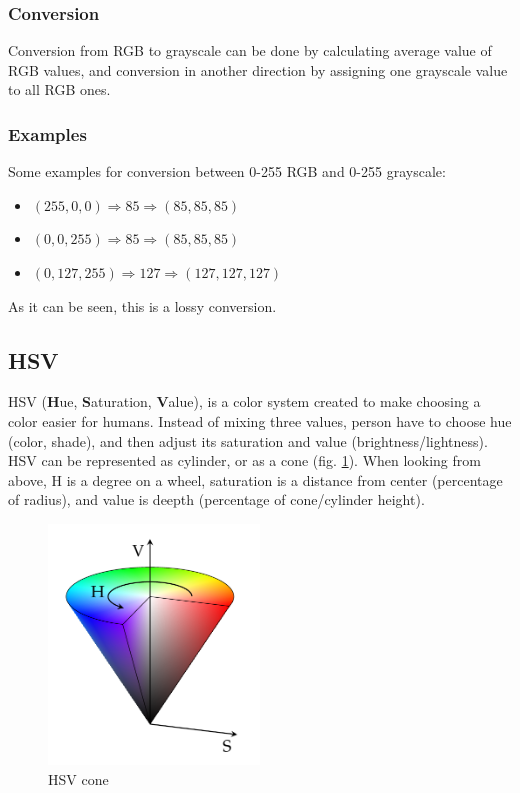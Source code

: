 \documentclass[titlepage]{article}
\begin{document}
\subsubsection{Conversion}
Conversion from RGB to grayscale can be done by calculating average value of RGB
values, and conversion in another direction by assigning one grayscale value to
all RGB ones.

\subsubsection{Examples}
Some examples for conversion between 0-255 RGB and 0-255 grayscale:
\begin{itemize}
  \item $(255, 0, 0) \Rightarrow 85 \Rightarrow (85, 85, 85)$
  \item $(0, 0, 255) \Rightarrow 85 \Rightarrow (85, 85, 85)$
  \item $(0, 127, 255) \Rightarrow 127 \Rightarrow (127, 127, 127)$
\end{itemize}
As it can be seen, this is a lossy conversion.

\subsection{HSV}
HSV (\textbf{H}ue, \textbf{S}aturation, \textbf{V}alue), is a color system
created to make choosing a color easier for humans. Instead of mixing three
values, person have to choose hue (color, shade), and then adjust its saturation
and value (brightness/lightness). HSV can be represented as cylinder, or as a
cone (fig. \ref{fig:hsv}). When looking from above, H is a degree on a wheel,
saturation is a distance from center (percentage of radius), and
value is deepth (percentage of cone/cylinder height).

\begin{figure}[!htb]
	\centering
	\includegraphics[width=0.5\textwidth]{img/hsv.png} 
	\caption{HSV cone}
	\label{fig:hsv}
\end{figure}
\end{document}
